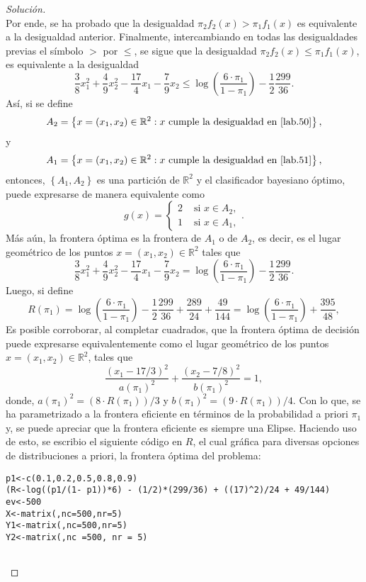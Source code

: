 \documentclass[10.5pt,notitlepage]{article}
\newenvironment{solucion}
  {\begin{proof}[Solución]}
  {\end{proof}}
\newcommand{\RR}{\mathbb{R}}
\newcommand{\kis}[1]{\left\{ #1 \right\}}
\newcommand{\pare}[1]{\left( #1 \right)}
\theoremstyle{plain}
\begin{document}
\begin{solucion}
\begin{equation}
\end{equation}
Por ende, se ha probado que la desigualdad \(\pi_2f_{2}(x) > \pi_{1}f_{1}(x)\) es equivalente a la desigualdad anterior. Finalmente, intercambiando en todas las desigualdades previas el símbolo \(>\) por \(\leq\), se sigue que la desigualdad \(\pi_2f_{2}(x) \leq \pi_{1}f_{1}(x)\), es equivalente a la desigualdad
\begin{equation}\label{lab.51}
  \frac{3}{8}x_{1}^{2}+ \frac{4}{9}x_{2}^2 -\frac{17}{4}x_1 - \frac{7}{9}x_{2} \leq \log\pare{\frac{6\cdot\pi_{1}}{1 -\pi_{1}}} - \frac{1}{2}\frac{299}{36}.
\end{equation}
Así, si se define \[A_2 = \kis{x =(x_1, x_{2})\in \RR^{2}: x \text{ cumple la desigualdad en \eqref{lab.50}}},\] y  \[A_1 = \left\{x =(x_1, x_{2})\in \RR^{2}: x \text{ cumple la desigualdad en \eqref{lab.51}}\right\},\] entonces, \(\kis{A_{1},A_{2}}\) es una partición de \(\RR^2\) y el clasificador bayesiano óptimo, puede expresarse de manera equivalente como
\begin{equation}\label{lab.301}
    g(x) = \begin{cases}
2 & \text{ si } x \in A_{2}, \\ 
1 & \text{ si } x \in A_{1}, 
\end{cases}.
\end{equation}
Más aún, la frontera óptima es la frontera de \(A_1\) o de \(A_2\), es decir, es el lugar geométrico de los puntos \(x = (x_1, x_2)\in \RR^2\) tales que 
\[
\frac{3}{8}x_{1}^{2}+ \frac{4}{9}x_{2}^2 -\frac{17}{4}x_1 - \frac{7}{9}x_{2} = \log\pare{\frac{6\cdot\pi_{1}}{1 -\pi_{1}}} - \frac{1}{2}\frac{299}{36}.
\]
Luego, si define
\[
R(\pi_1)=\log\pare{\frac{6\cdot\pi_{1}}{1 -\pi_{1}}} - \frac{1}{2}\frac{299}{36} + \frac{289}{24} + \frac{49}{144}=\log\pare{\frac{6\cdot\pi_{1}}{1 -\pi_{1}}} + \frac{395}{48},
\]
Es posible corroborar, al completar cuadrados, que la frontera óptima de decisión puede expresarse equivalentemente como el lugar geométrico de los puntos \(x = (x_1, x_2)\in \RR^2\), tales que  
\[
\frac{(x_1 - 17/3)^2}{a(\pi_{1})^2}  + \frac{(x_2 - 7/8)^2}{b(\pi_{1})^2} = 1,
\]
donde, \(a(\pi_{1})^2 = (8\cdot R(\pi_1))/3\) y \(b(\pi_{1})^2 = (9\cdot R(\pi_1))/4\). Con lo que, se ha parametrizado a la frontera eficiente en términos de la probabilidad a priori \(\pi_1\) y, se puede apreciar que la frontera eficiente es siempre una Elipse. Haciendo uso de esto, se escribio el siguiente código en \(R\), el cual gráfica para diversas opciones de distribuciones a priori, la frontera óptima del problema:
\begin{verbatim}
p1<-c(0.1,0.2,0.5,0.8,0.9)
(R<-log((p1/(1- p1))*6) - (1/2)*(299/36) + ((17)^2)/24 + 49/144)
ev<-500
X<-matrix(,nc=500,nr=5)
Y1<-matrix(,nc=500,nr=5)
Y2<-matrix(,nc =500, nr = 5)


\end{verbatim}
\end{solucion}
\end{document}

